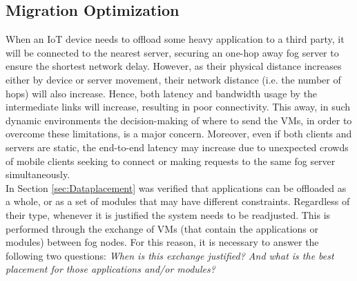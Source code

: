 \vfill\pagebreak
\subsection{Migration Optimization}
\label{sec:Migration}
When an IoT device needs to offload some heavy application to a third party, it will be connected to the nearest server, securing an one-hop away fog server to ensure the shortest network delay. However, as their physical distance increases either by device or server movement, their network distance (i.e. the number of hops) will also increase. Hence, both latency and bandwidth usage by the intermediate links will increase, resulting in poor connectivity. This away, in such dynamic environments the decision-making of where to send the VMs, in order to overcome these limitations, is a major concern. Moreover, even if both clients and servers are static, the end-to-end latency may increase due to unexpected crowds of mobile clients seeking to connect or making requests to the same fog server simultaneously.\\
\noindent\tab In Section \ref{sec:Dataplacement} was verified that applications can be offloaded as a whole, or as a set of modules that may have different constraints. Regardless of their type, whenever it is justified the system needs to be readjusted. This is performed through the exchange of VMs (that contain the applications or modules) between fog nodes. For this reason, it is necessary to answer the following two questions: \textit{When is this exchange justified? And what is the best placement for those applications and/or modules?}\\

